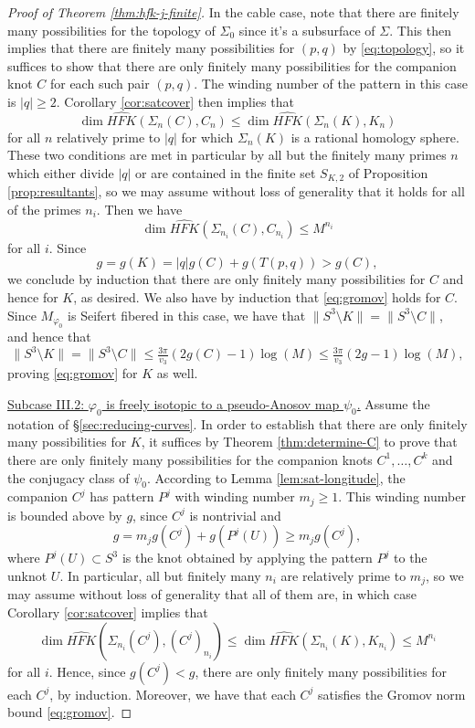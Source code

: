 \documentclass[11pt]{amsart}
\numberwithin{equation}{section}
\numberwithin{theorem}{section}
\theoremstyle{definition}
\newcommand\HFK{\widehat{\mathit{HFK}}}
\begin{document}
\begin{proof}[Proof of Theorem \ref{thm:hfk-j-finite}]
In the cable case, note that there are finitely many possibilities for the topology of $\Sigma_0$ since it's a subsurface of $\Sigma$. This then implies that there are finitely many possibilities for $(p,q)$ by \eqref{eq:topology}, so it suffices to show that there are only finitely many possibilities for the companion knot $C$ for each such pair $(p,q)$. The winding number of the pattern in this case is $|q|\geq 2$. Corollary \ref{cor:satcover} then implies that \[\dim\HFK(\Sigma_n(C),C_n)\leq \dim\HFK(\Sigma_n(K),K_n)\] for all $n$ relatively prime to $|q|$ for which  $\Sigma_n(K)$ is a rational homology sphere. These two conditions are met in particular by all but the finitely many primes $n$ which either divide $|q|$ or are contained in the finite set $S_{K,2}$ of Proposition \ref{prop:resultants}, so we may assume without loss of generality that it holds for all of the primes $n_i$. Then we have  \[\dim\HFK(\Sigma_{n_i}(C),C_{n_i})\leq M^{n_i}\] for all $i$. Since \[g=g(K) = |q|g(C) + g(T(p,q))>g(C),\] we conclude by induction that there are only finitely many possibilities for $C$ and hence for $K$, as desired. We also have by induction that \eqref{eq:gromov} holds for $C$. Since $M_{\varphi_0}$ is Seifert fibered in this case, we have that $\lVert S^3\setminus K \rVert = \lVert S^3\setminus C \rVert$, and hence that \[\lVert S^3\setminus K \rVert =\lVert S^3\setminus C \rVert\leq \tfrac{3\pi}{v_3}(2g(C)-1)\log(M) \leq \tfrac{3\pi}{v_3}(2g-1)\log(M),\] proving \eqref{eq:gromov} for $K$ as well.

\underline{Subcase III.2: $\varphi_0$ is freely isotopic to a pseudo-Anosov map $\psi_0$.}
Assume the notation of \S\ref{sec:reducing-curves}.  In order to establish that there are only finitely many possibilities for $K$, it suffices by Theorem \ref{thm:determine-C} to prove that there are only finitely many possibilities for the companion knots $C^1,\dots,C^k$ and the conjugacy class of $\psi_0$. According to Lemma \ref{lem:sat-longitude}, the companion $C^j$ has pattern $P^j$ with winding number $m_j\geq 1$. This winding number is bounded above by $g$, since $C^j$ is nontrivial and  \[g=m_jg(C^j)+ g(P^j(U)) \geq m_jg(C^j), \] where $P^j(U)\subset S^3$ is the knot obtained by applying the pattern $P^j$ to the unknot $U$. In particular, all but finitely many $n_i$ are relatively prime to $m_j$, so we may assume without loss of generality that all of them are, in which case Corollary \ref{cor:satcover} implies that \[\dim\HFK(\Sigma_{n_i}(C^j),(C^j)_{n_i})\leq \dim\HFK(\Sigma_{n_i}(K),K_{n_i}) \leq M^{n_i}\] for all $i$. Hence, since $g(C^j)<g$, there are only finitely many possibilities for each $C^j$, by induction. Moreover, we have that each $C^j$ satisfies the Gromov norm bound \eqref{eq:gromov}.


\end{proof}
\end{document}
